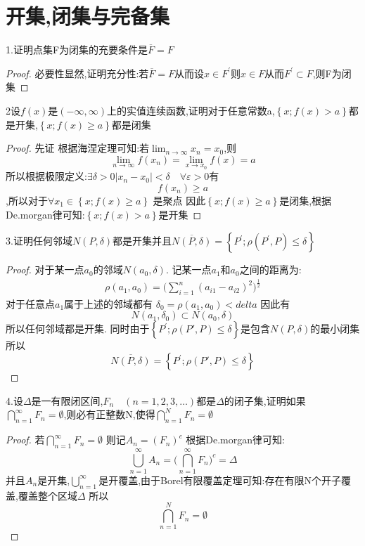 \section{开集,闭集与完备集}
1.证明点集F为闭集的充要条件是\(\overline{F} = F\)
\begin{proof}
    必要性显然,证明充分性:若\(\overline{F}=F\)从而设\(x \in F^{'}\)则\(x\in F\)从而\(F^{'} \subset F\),则F为闭集
\end{proof}
2设\(f(x)\)是\((-\infty,\infty)\)上的实值连续函数,证明对于任意常数a,\(\left\{x ; f(x) >a\right\}\)都是开集,\(\left\{x ; f(x) \geq a \right\}\)都是闭集
\begin{proof}
        先证
    根据海涅定理可知:若\(\lim_{n\rightarrow \infty} x_n =x_0 \),则\[\lim_{n \rightarrow \infty}f(x_n) =\lim_{x \rightarrow x_0} f(x) =a\]
    所以根据极限定义:\(\exists \delta > 0 |x_n - x_0| < \delta \quad \forall \varepsilon > 0\)有\[f(x_n) \geq a \],所以对于\(\forall x_1 \in \left\{x ; f(x) \geq a\right\}\) 是聚点
    因此\(\left\{x ; f(x) \geq a \right\}\)是闭集,根据De.morgan律可知:\(\left\{x ; f(x) >a\right\}\)是开集
\end{proof}
3.证明任何邻域\(N(P , \delta)\)都是开集并且\(\overline{N(P,\delta)} = \left\{P^{'} ; \rho(P^{'} , P) \leq \delta \right\}\)
\begin{proof}
    对于某一点\(a_0\)的邻域\(N(a_0,\delta)\).
    记某一点\(a_1\)和\(a_0\)之间的距离为:\begin{align*}
        \rho(a_1,a_0) =\bigl(\sum_{i=1}^{n}(a_{i1} - a_{i2})^2\bigr)^{\frac{1}{2}}
    \end{align*}
    对于任意点\(a_1\)属于上述的邻域都有 \(\delta_0 = \rho(a_1 , a_0) < delta\)
    因此有\[N(a_1 , \delta_0) \subset N(a_0,\delta)\]
    所以任何邻域都是开集. 同时由于\(\left\{P^{'} ; \rho(P{'},P) \leq \delta\right\}\)是包含\(N(P,\delta)\)的最小闭集 所以
    \[\overline{N(P,\delta)} = \left\{P^{'} ; \rho(P{'},P) \leq \delta\right\}\]
\end{proof}
4.设\(\Delta\)是一有限闭区间,\(F_n \quad (n=1,2,3,\dots )\)都是\(\Delta\)的闭子集,证明如果\(\bigcap\limits_{n=1}^{\infty} F_n = \emptyset\),则必有正整数N,使得\(\bigcap\limits_{n=1}^{N}F_n = \emptyset\)
\begin{proof}
    若\(\bigcap\limits_{n=1}^{\infty} F_n = \emptyset \) 则记\(A_n = (F_n)^c\)
    根据De.morgan律可知: 
    \[\bigcup\limits_{n=1}^{\infty}A_n = \bigl(\bigcap\limits_{n=1}^{\infty} F_n \bigr)^c = \Delta\]
    并且\(A_n\)是开集,\(\bigcup\limits_{n=1}^{\infty}\)是开覆盖,由于Borel有限覆盖定理可知:存在有限N个开子覆盖,覆盖整个区域\(\Delta\)
    所以\[\bigcap\limits_{n=1}^{N} F_n = \emptyset\]
\end{proof}
